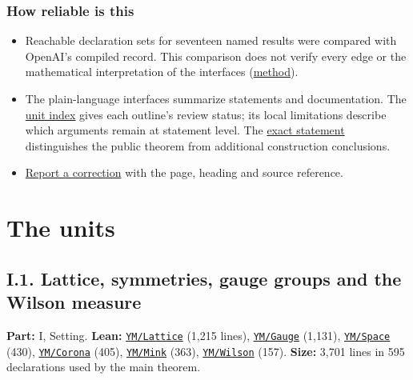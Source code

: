 \documentclass[
  letterpaper,
  11pt]{article}
\providecommand{\tightlist}{%
  \setlength{\itemsep}{0pt}\setlength{\parskip}{0pt}}
\begin{document}
\subsubsection{How reliable is this}\label{how-reliable-is-this}

\begin{itemize}
\tightlist
\item
  Reachable declaration sets for seventeen named results were compared
  with OpenAI's compiled record. This comparison does not verify every
  edge or the mathematical interpretation of the interfaces
  (\href{https://github.com/scottnarmstrong/yang-mills-informalization/blob/main/method.md\#1-the-dependency-graph}{method}).
\item
  The plain-language interfaces summarize statements and documentation.
  The
  \href{https://github.com/scottnarmstrong/yang-mills-informalization/blob/main/outline/units.md}{unit
  index} gives each outline's review status; its local limitations
  describe which arguments remain at statement level. The
  \href{https://github.com/scottnarmstrong/yang-mills-informalization/blob/main/statement.md}{exact
  statement} distinguishes the public theorem from additional
  construction conclusions.
\item
  \href{https://github.com/scottnarmstrong/yang-mills-informalization/issues}{Report
  a correction} with the page, heading and source reference.
\end{itemize}

\section{The units}\label{the-units}

\subsection{I.1. Lattice, symmetries, gauge groups and the Wilson
measure}\label{i.1.-lattice-symmetries-gauge-groups-and-the-wilson-measure}

\textbf{Part:} I, Setting. \textbf{Lean:}
\href{https://github.com/yang-mills-group/OpenAI-YM-20261028/tree/3456e5e75cf8d4cd558955a5c7638fba2d68f464/YM/Lattice}{\texttt{YM/Lattice}}
(1,215 lines),
\href{https://github.com/yang-mills-group/OpenAI-YM-20261028/tree/3456e5e75cf8d4cd558955a5c7638fba2d68f464/YM/Gauge}{\texttt{YM/Gauge}}
(1,131),
\href{https://github.com/yang-mills-group/OpenAI-YM-20261028/tree/3456e5e75cf8d4cd558955a5c7638fba2d68f464/YM/Space}{\texttt{YM/Space}}
(430),
\href{https://github.com/yang-mills-group/OpenAI-YM-20261028/tree/3456e5e75cf8d4cd558955a5c7638fba2d68f464/YM/Corona}{\texttt{YM/Corona}}
(405),
\href{https://github.com/yang-mills-group/OpenAI-YM-20261028/tree/3456e5e75cf8d4cd558955a5c7638fba2d68f464/YM/Mink}{\texttt{YM/Mink}}
(363),
\href{https://github.com/yang-mills-group/OpenAI-YM-20261028/tree/3456e5e75cf8d4cd558955a5c7638fba2d68f464/YM/Wilson}{\texttt{YM/Wilson}}
(157). \textbf{Size:} 3,701 lines in 595 declarations used by the main
theorem.
\end{document}
